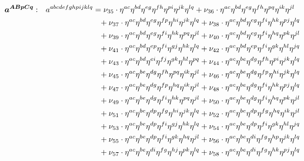 \documentclass[a4paper,12pt, DIV=14, BCOR=5mm, twoside, headsepline, numbers=noenddot]{scrbook}
\begin{document}
\begin{align}\label{LorentzArea2}
\begin{alignedat}{2}
\boldsymbol{a^{ABpCq}}&: \ \ \ & a^{abcdefghpijklq}  &= \nu_{35}\cdot\eta^{ac}\eta^{bd}\eta^{eg}\eta^{fh}\eta^{pi}\eta^{jk}\eta^{lq}+\nu_{36}\cdot\eta^{ac}\eta^{bd}\eta^{eg}\eta^{fh}\eta^{pq}\eta^{ik}\eta^{jl}\\
& & &\hphantom{=}
+\nu_{37}\cdot\eta^{ac}\eta^{bd}\eta^{eg}\eta^{fp}\eta^{hi}\eta^{jk}\eta^{lq}+\nu_{38}\cdot\eta^{ac}\eta^{bd}\eta^{eg}\eta^{fi}\eta^{hk}\eta^{pj}\eta^{lq}\\
& & &\hphantom{=}
+\nu_{39}\cdot\eta^{ac}\eta^{bd}\eta^{eg}\eta^{fi}\eta^{hk}\eta^{pq}\eta^{jl}+\nu_{40}\cdot\eta^{ac}\eta^{bd}\eta^{eg}\eta^{fi}\eta^{hq}\eta^{pk}\eta^{jl}\\
& & &\hphantom{=}
+\nu_{41}\cdot\eta^{ac}\eta^{bd}\eta^{ep}\eta^{fi}\eta^{gj}\eta^{hk}\eta^{lq}+\nu_{42}\cdot\eta^{ac}\eta^{bd}\eta^{ep}\eta^{fi}\eta^{gk}\eta^{hl}\eta^{jq}\\
& & &\hphantom{=}
+\nu_{43}\cdot\eta^{ac}\eta^{bd}\eta^{ei}\eta^{fj}\eta^{gk}\eta^{hl}\eta^{pq}+\nu_{44}\cdot\eta^{ac}\eta^{be}\eta^{dg}\eta^{fh}\eta^{pi}\eta^{jk}\eta^{lq}\\
& & &\hphantom{=}
+\nu_{45}\cdot\eta^{ac}\eta^{be}\eta^{dg}\eta^{fh}\eta^{pq}\eta^{ik}\eta^{jl}+\nu_{46}\cdot\eta^{ac}\eta^{be}\eta^{dg}\eta^{fp}\eta^{hi}\eta^{jk}\eta^{lq}\\
& & &\hphantom{=}
+\nu_{47}\cdot\eta^{ac}\eta^{be}\eta^{dg}\eta^{fp}\eta^{hq}\eta^{ik}\eta^{jl}+\nu_{48}\cdot\eta^{ac}\eta^{be}\eta^{dg}\eta^{fi}\eta^{hk}\eta^{pj}\eta^{lq}\\
& & &\hphantom{=}
+\nu_{49}\cdot\eta^{ac}\eta^{be}\eta^{dg}\eta^{fi}\eta^{hk}\eta^{pq}\eta^{jl}+\nu_{50}\cdot\eta^{ac}\eta^{be}\eta^{dg}\eta^{fi}\eta^{hq}\eta^{pk}\eta^{jl}\\
& & &\hphantom{=}
+\nu_{51}\cdot\eta^{ac}\eta^{be}\eta^{dp}\eta^{fg}\eta^{hi}\eta^{jk}\eta^{lq}+\nu_{52}\cdot\eta^{ac}\eta^{be}\eta^{dp}\eta^{fg}\eta^{hq}\eta^{ik}\eta^{jl}\\
& & &\hphantom{=}
+\nu_{53}\cdot\eta^{ac}\eta^{be}\eta^{dp}\eta^{fi}\eta^{gj}\eta^{hk}\eta^{lq}+\nu_{54}\cdot\eta^{ac}\eta^{be}\eta^{dp}\eta^{fi}\eta^{gk}\eta^{hl}\eta^{jq}\\
& & &\hphantom{=}
+\nu_{55}\cdot\eta^{ac}\eta^{be}\eta^{dp}\eta^{fi}\eta^{gk}\eta^{hq}\eta^{jl}+\nu_{56}\cdot\eta^{ac}\eta^{be}\eta^{di}\eta^{fg}\eta^{hp}\eta^{jk}\eta^{lq}\\
& & &\hphantom{=}
+\nu_{57}\cdot\eta^{ac}\eta^{be}\eta^{di}\eta^{fg}\eta^{hj}\eta^{pk}\eta^{lq}+\nu_{58}\cdot\eta^{ac}\eta^{be}\eta^{di}\eta^{fg}\eta^{hk}\eta^{pj}\eta^{lq}\\

\end{alignedat}
\end{align}
\end{document}
